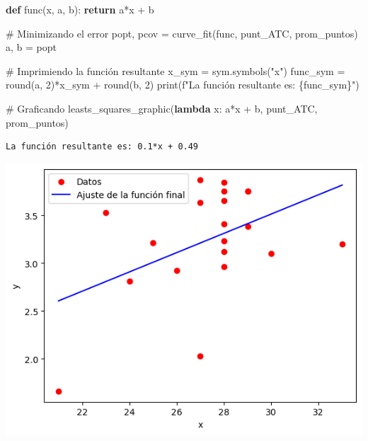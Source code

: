 \documentclass[
  letterpaper,
  DIV=11,
  numbers=noendperiod]{scrartcl}
\newenvironment{Shaded}{\begin{snugshade}}{\end{snugshade}}
\newcommand{\BuiltInTok}[1]{\textcolor[rgb]{0.00,0.23,0.31}{#1}}
\newcommand{\CommentTok}[1]{\textcolor[rgb]{0.37,0.37,0.37}{#1}}
\newcommand{\ControlFlowTok}[1]{\textcolor[rgb]{0.00,0.23,0.31}{\textbf{#1}}}
\newcommand{\DecValTok}[1]{\textcolor[rgb]{0.68,0.00,0.00}{#1}}
\newcommand{\KeywordTok}[1]{\textcolor[rgb]{0.00,0.23,0.31}{\textbf{#1}}}
\newcommand{\NormalTok}[1]{\textcolor[rgb]{0.00,0.23,0.31}{#1}}
\newcommand{\OperatorTok}[1]{\textcolor[rgb]{0.37,0.37,0.37}{#1}}
\newcommand{\SpecialCharTok}[1]{\textcolor[rgb]{0.37,0.37,0.37}{#1}}
\newcommand{\SpecialStringTok}[1]{\textcolor[rgb]{0.13,0.47,0.30}{#1}}
\newcommand{\StringTok}[1]{\textcolor[rgb]{0.13,0.47,0.30}{#1}}
\begin{document}
\begin{Shaded}
\begin{Highlighting}[]

\KeywordTok{def}\NormalTok{ func(x, a, b):}
    \ControlFlowTok{return}\NormalTok{ a}\OperatorTok{*}\NormalTok{x }\OperatorTok{+}\NormalTok{ b}

\CommentTok{\# Minimizando el error}
\NormalTok{popt, pcov }\OperatorTok{=}\NormalTok{ curve\_fit(func, punt\_ATC, prom\_puntos)}
\NormalTok{a, b }\OperatorTok{=}\NormalTok{ popt}

\CommentTok{\# Imprimiendo la función resultante}
\NormalTok{x\_sym }\OperatorTok{=}\NormalTok{ sym.symbols(}\StringTok{"x"}\NormalTok{)}
\NormalTok{func\_sym }\OperatorTok{=} \BuiltInTok{round}\NormalTok{(a, }\DecValTok{2}\NormalTok{)}\OperatorTok{*}\NormalTok{x\_sym }\OperatorTok{+} \BuiltInTok{round}\NormalTok{(b, }\DecValTok{2}\NormalTok{)}
\BuiltInTok{print}\NormalTok{(}\SpecialStringTok{f"La función resultante es: }\SpecialCharTok{\{}\NormalTok{func\_sym}\SpecialCharTok{\}}\SpecialStringTok{"}\NormalTok{)}

\CommentTok{\# Graficando}
\NormalTok{leasts\_squares\_graphic(}\KeywordTok{lambda}\NormalTok{ x: a}\OperatorTok{*}\NormalTok{x }\OperatorTok{+}\NormalTok{ b, punt\_ATC, prom\_puntos)}
\end{Highlighting}
\end{Shaded}

\begin{verbatim}
La función resultante es: 0.1*x + 0.49
\end{verbatim}

\includegraphics{Tarea8_MN_files/figure-pdf/cell-17-output-2.png}
\end{document}
